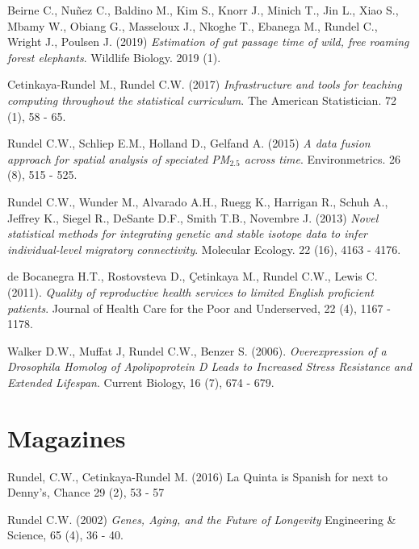 \documentclass[margin,line]{res}
\begin{document}
\begin{resume}
\vspace{-0.15cm}
Beirne C., Nuñez C., Baldino M., Kim S., Knorr J., Minich T., Jin L., Xiao S., Mbamy W., Obiang G., Masseloux J., Nkoghe T., Ebanega M., Rundel C., Wright J., Poulsen J. (2019) {\em Estimation of gut passage time of wild, free roaming forest elephants}. Wildlife Biology. 2019 (1).

\vspace{-0.15cm}
Cetinkaya-Rundel M., Rundel C.W. (2017) {\em Infrastructure and tools for teaching computing throughout the statistical curriculum}. The American Statistician. 72 (1), 58 - 65.

\vspace{-0.15cm}
Rundel C.W., Schliep E.M., Holland D., Gelfand A. (2015) {\em A data fusion approach for spatial analysis of speciated PM$_{2.5}$ across time}. Environmetrics. 26 (8), 515 - 525.

\vspace{-0.15cm}
Rundel C.W., Wunder M., Alvarado A.H., Ruegg K., Harrigan R., Schuh A., Jeffrey K., Siegel R., DeSante D.F., Smith T.B., Novembre J. (2013) {\em Novel statistical methods for integrating genetic and stable isotope data to infer individual-level migratory connectivity}. Molecular Ecology. 22 (16), 4163 - 4176.

\vspace{-0.15cm}
de Bocanegra H.T., Rostovsteva D., \c{C}etinkaya M., Rundel C.W., Lewis C. (2011). {\em Quality of reproductive health services to limited English proficient patients}. Journal of Health Care for the Poor and Underserved, 22 (4), 1167 - 1178.

\vspace{-0.15cm}
Walker D.W., Muffat J, Rundel C.W., Benzer S. (2006). {\em Overexpression of a Drosophila Homolog of Apolipoprotein D Leads to Increased Stress Resistance and Extended Lifespan}. Current Biology, 16 (7), 674 - 679.


\vspace{4mm}

%

\section{\sc Magazines}

Rundel, C.W., Cetinkaya-Rundel M. (2016) La Quinta is Spanish for next to Denny's, Chance 29 (2), 53 - 57


Rundel C.W. (2002) {\em Genes, Aging, and the Future of Longevity} Engineering \& Science, 65 (4), 36 - 40.


\end{resume}
\end{document}
